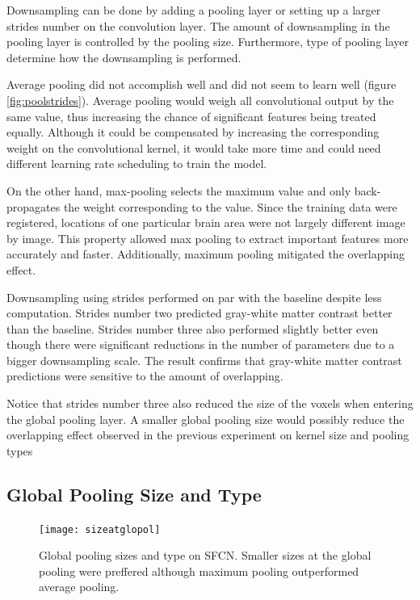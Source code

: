 \documentclass{article}
\begin{document}
    Downsampling can be done by adding a pooling layer or setting up a larger strides number on the convolution layer. 
    The amount of downsampling in the pooling layer is controlled by the pooling size. Furthermore, type of pooling layer determine how the downsampling is performed.   

    Average pooling did not accomplish well and did not seem to learn well (figure \ref{fig:poolstrides}). 
    Average pooling would weigh all convolutional output by the same value, thus increasing the chance of significant features being treated equally. 
    Although it could be compensated by increasing the corresponding weight on the convolutional kernel, it would take more time and could need different learning rate scheduling to train the model.

    On the other hand, max-pooling selects the maximum value and only back-propagates the weight corresponding to the value. 
    Since the training data were registered, locations of one particular brain area were not largely different image by image. 
    This property allowed max pooling to extract important features more accurately and faster. 
    Additionally, maximum pooling mitigated the overlapping effect.

    Downsampling using strides performed on par with the baseline despite less computation. 
    Strides number two predicted gray-white matter contrast better than the baseline. 
    Strides number three also performed slightly better even though there were significant reductions in the number of parameters due to a bigger downsampling scale. 
    The result confirms that gray-white matter contrast predictions were sensitive to the amount of overlapping.

    Notice that strides number three also reduced the size of the voxels when entering the global pooling layer. 
    A smaller global pooling size would possibly reduce the overlapping effect observed in the previous experiment on kernel size and pooling types

    \subsection*{Global Pooling Size and Type}
    
    \begin{figure}[h]
        \centering
        \texttt{[image: sizeatglopol]}
        \centering
        \caption{
            Global pooling sizes and type on SFCN. 
            Smaller sizes at the global pooling were preffered although maximum pooling outperformed average pooling.}
        \label{fig:glopolsizetype}
    \end{figure}
    
\end{document}

